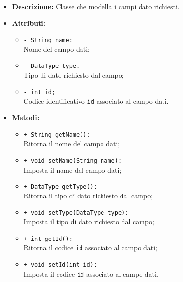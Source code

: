 \begin{flushleft}
\begin{itemize}
\item \textbf{Descrizione:} Classe che modella i campi dato richiesti.
\item \textbf{Attributi:}
\begin{sloppypar}
\begin{itemize}
\item \texttt{- String name:}\\ Nome del campo dati;
\item \texttt{- DataType type:}\\ Tipo di dato richiesto dal campo;
\item \texttt{- int id;}\\Codice identificativo \texttt{id} associato al campo dati.
\end{itemize}
\end{sloppypar}
\item \textbf{Metodi:}
\begin{sloppypar}
\begin{itemize}
\item \texttt{+ String getName():}\\ Ritorna il nome del campo dati;
\item \texttt{+ void setName(String name):}\\ Imposta il nome del campo dati;
\item \texttt{+ DataType getType():}\\ Ritorna il tipo di dato richiesto dal campo;
\item \texttt{+ void setType(DataType type):}\\ Imposta il tipo di dato richiesto dal campo;
\item \texttt{+ int getId():}\\ Ritorna il codice \texttt{id} associato al campo dati;
\item \texttt{+ void setId(int id):}\\ Imposta il codice \texttt{id} associato al campo dati.
\end{itemize}
\end{sloppypar}
\end{itemize}
\end{flushleft}


